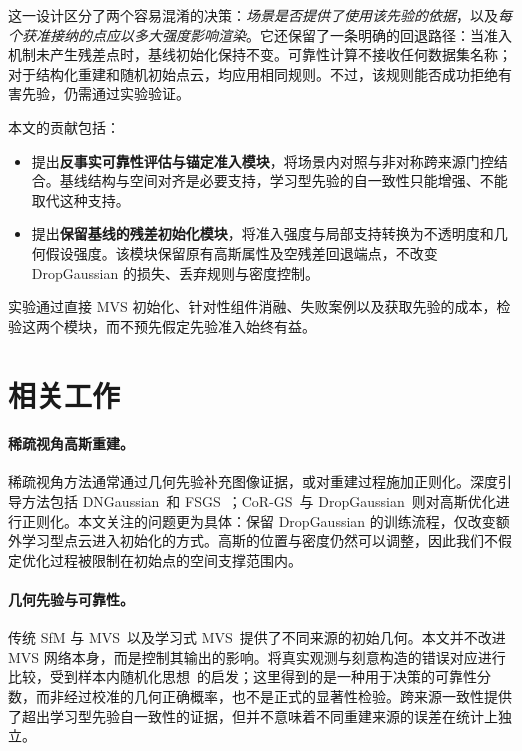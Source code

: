 \documentclass{article}
\begin{document}
这一设计区分了两个容易混淆的决策：\emph{场景是否提供了使用该先验的依据}，以及\emph{每个获准接纳的点应以多大强度影响渲染}。它还保留了一条明确的回退路径：当准入机制未产生残差点时，基线初始化保持不变。可靠性计算不接收任何数据集名称；对于结构化重建和随机初始点云，均应用相同规则。不过，该规则能否成功拒绝有害先验，仍需通过实验验证。

本文的贡献包括：
\begin{itemize}
\item 提出\textbf{反事实可靠性评估与锚定准入模块}，将场景内对照与非对称跨来源门控结合。基线结构与空间对齐是必要支持，学习型先验的自一致性只能增强、不能取代这种支持。
\item 提出\textbf{保留基线的残差初始化模块}，将准入强度与局部支持转换为不透明度和几何假设强度。该模块保留原有高斯属性及空残差回退端点，不改变 DropGaussian 的损失、丢弃规则与密度控制。
\end{itemize}
实验通过直接 MVS 初始化、针对性组件消融、失败案例以及获取先验的成本，检验这两个模块，而不预先假定先验准入始终有益。

\section{相关工作}
\label{sec:related}

\paragraph{稀疏视角高斯重建。}
稀疏视角方法通常通过几何先验补充图像证据，或对重建过程施加正则化。深度引导方法包括 DNGaussian~\citep{li2024dngaussian}和 FSGS~\citep{zhu2024fsgs}；CoR-GS~\citep{zhang2024corgs}与 DropGaussian~\citep{park2025dropgaussian}则对高斯优化进行正则化。本文关注的问题更为具体：保留 DropGaussian 的训练流程，仅改变额外学习型点云进入初始化的方式。高斯的位置与密度仍然可以调整，因此我们不假定优化过程被限制在初始点的空间支撑范围内。

\paragraph{几何先验与可靠性。}
传统 SfM 与 MVS~\citep{schoenberger2016sfm,schoenberger2016mvs}以及学习式 MVS~\citep{izquierdo2025mvsanywhere}提供了不同来源的初始几何。本文并不改进 MVS 网络本身，而是控制其输出的影响。将真实观测与刻意构造的错误对应进行比较，受到样本内随机化思想~\citep{good2005permutation}的启发；这里得到的是一种用于决策的可靠性分数，而非经过校准的几何正确概率，也不是正式的显著性检验。跨来源一致性提供了超出学习型先验自一致性的证据，但并不意味着不同重建来源的误差在统计上独立。
\end{document}
